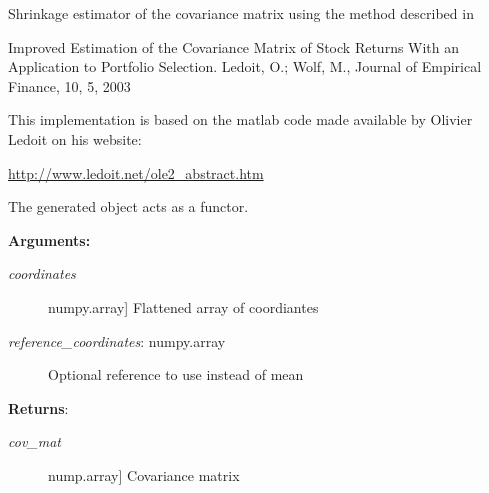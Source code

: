 \documentclass[letterpaper,10pt,english]{sphinxmanual}
\begin{document}
\begin{fulllineitems}
\label{index:encore.covariance.EstimatorShrinkage}
Shrinkage estimator of the covariance matrix using the method described in

Improved Estimation of the Covariance Matrix of Stock Returns With an Application 
to Portfolio Selection. Ledoit, O.; Wolf, M., Journal of Empirical Finance, 10, 5, 2003

This implementation is based on the matlab code made available by Olivier Ledoit on
his website:

\href{http://www.ledoit.net/ole2\_abstract.htm}{http://www.ledoit.net/ole2\_abstract.htm}

The generated object acts as a functor.

\begin{fulllineitems}
\label{index:encore.covariance.EstimatorShrinkage.calculate}
\textbf{Arguments:}
\begin{description}
\item[{\emph{coordinates}}] \leavevmode{[}numpy.array{]}
Flattened array of coordiantes

\item[{\emph{reference\_coordinates}: numpy.array}] \leavevmode
Optional reference to use instead of mean

\end{description}

\textbf{Returns}:
\begin{description}
\item[{\emph{cov\_mat}}] \leavevmode{[}nump.array{]}
Covariance matrix

\end{description}

\end{fulllineitems}


\end{fulllineitems}

\end{document}
